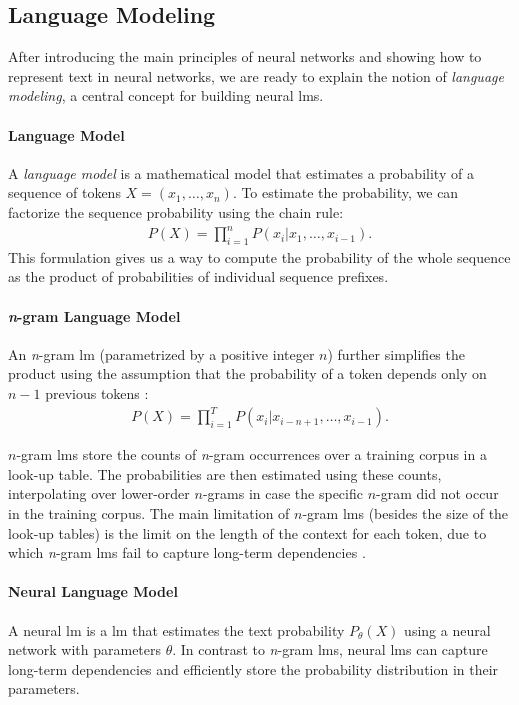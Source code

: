 {\subsection{Language Modeling}
\label{sec:lm-basics}
After introducing the main principles of neural networks and showing how to represent text in neural networks, we are ready to explain the notion of \emph{language modeling}, a central concept for building neural \acp{lm}.

\paragraph{Language Model} A \emph{language model} is a mathematical model that estimates a probability of a sequence of tokens $X = (x_1, \ldots, x_n)$. To estimate the probability, we can factorize the sequence probability using the chain rule:
\begin{align}
    P(X) = \prod_{i=1}^n P(x_i|x_1, \hdots, x_{i-1}).
\end{align}
This formulation gives us a way to compute the probability of the whole sequence as the product of probabilities of individual sequence prefixes.

\paragraph{\emph{n}-gram Language Model} An \emph{n}-gram \ac{lm} (parametrized by a positive integer $n$) further simplifies the product using the assumption that the probability of a token depends only on $n-1$ previous tokens \cite[p.32]{jurafsky2024}:
\begin{align}
    P(X) = \prod_{i=1}^T P(x_i|x_{i-n+1}, \hdots,x_{i-1}).
\end{align}

$n$-gram \acp{lm} store the counts of \emph{n}-gram occurrences over a training corpus in a look-up table. The probabilities are then estimated using these counts, interpolating over lower-order $n$-grams in case the specific $n$-gram did not occur in the training corpus. The main limitation of $n$-gram \acp{lm} (besides the size of the look-up tables) is the limit on the length of the context for each token, due to which \emph{n}-gram \acp{lm} fail to capture long-term dependencies \cite{bengio2000neural}.




\paragraph{Neural Language Model} A neural \ac{lm} is a \acl{lm} that estimates the text probability $P_\theta(X)$ using a neural network with parameters $\theta$. In contrast to \emph{n}-gram \acp{lm}, neural \acp{lm} can capture long-term dependencies and efficiently store the probability distribution in their parameters.

}
